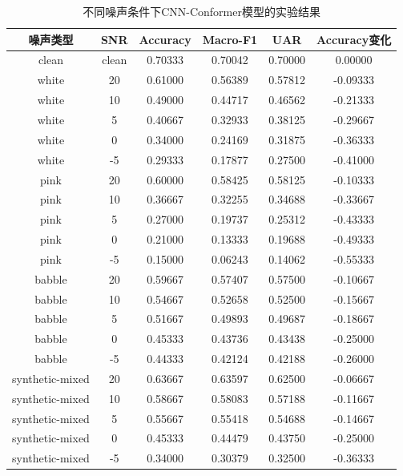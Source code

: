 \begin{table}[!t]
    \centering
    \caption{不同噪声条件下CNN-Conformer模型的实验结果}
    \label{tab:chapter4_noise_results}
    \tiny
    \setlength{\tabcolsep}{2.5pt}
    \renewcommand{\arraystretch}{0.68}
    \begin{tabular}{cccccc}
        \toprule
        噪声类型 & SNR & Accuracy & Macro-F1 & UAR & Accuracy变化 \\
        \midrule
        clean & clean & 0.70333 & 0.70042 & 0.70000 & 0.00000 \\
        white & 20 & 0.61000 & 0.56389 & 0.57812 & -0.09333 \\
        white & 10 & 0.49000 & 0.44717 & 0.46562 & -0.21333 \\
        white & 5 & 0.40667 & 0.32933 & 0.38125 & -0.29667 \\
        white & 0 & 0.34000 & 0.24169 & 0.31875 & -0.36333 \\
        white & -5 & 0.29333 & 0.17877 & 0.27500 & -0.41000 \\
        pink & 20 & 0.60000 & 0.58425 & 0.58125 & -0.10333 \\
        pink & 10 & 0.36667 & 0.32255 & 0.34688 & -0.33667 \\
        pink & 5 & 0.27000 & 0.19737 & 0.25312 & -0.43333 \\
        pink & 0 & 0.21000 & 0.13333 & 0.19688 & -0.49333 \\
        pink & -5 & 0.15000 & 0.06243 & 0.14062 & -0.55333 \\
        babble & 20 & 0.59667 & 0.57407 & 0.57500 & -0.10667 \\
        babble & 10 & 0.54667 & 0.52658 & 0.52500 & -0.15667 \\
        babble & 5 & 0.51667 & 0.49893 & 0.49687 & -0.18667 \\
        babble & 0 & 0.45333 & 0.43736 & 0.43438 & -0.25000 \\
        babble & -5 & 0.44333 & 0.42124 & 0.42188 & -0.26000 \\
        synthetic-mixed & 20 & 0.63667 & 0.63597 & 0.62500 & -0.06667 \\
        synthetic-mixed & 10 & 0.58667 & 0.58083 & 0.57188 & -0.11667 \\
        synthetic-mixed & 5 & 0.55667 & 0.55418 & 0.54688 & -0.14667 \\
        synthetic-mixed & 0 & 0.45333 & 0.44479 & 0.43750 & -0.25000 \\
        synthetic-mixed & -5 & 0.34000 & 0.30379 & 0.32500 & -0.36333 \\
        \bottomrule
    \end{tabular}
\end{table}


